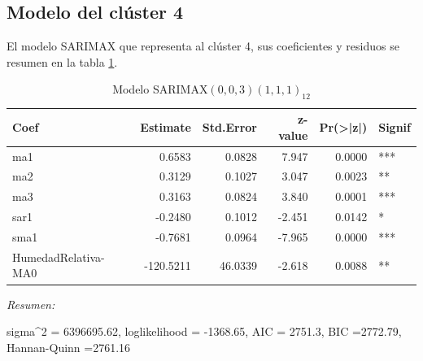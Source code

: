 \documentclass[12pt,oneside]{book}\usepackage[]{graphicx}\usepackage[]{color}
\newenvironment{knitrout}{}{} %
\theoremstyle{definition} %
\begin{document}
\subsection{Modelo del clúster 4}



El modelo SARIMAX que representa al clúster 4, sus coeficientes y residuos se resumen en la tabla \ref{tab:sarimax_cl4}.




\begin{knitrout}
\color{fgcolor}\begin{table}

\caption{\label{tab:unnamed-chunk-115}\label{tab:sarimax_cl4}Modelo SARIMAX$(0,0,3)(1,1,1)_{12}$}
\centering
\begin{threeparttable}
\begin{tabular}[t]{lrrrrl}
\toprule
Coef & Estimate & Std.Error & z-value & Pr(>|z|) & Signif\\
\midrule
\rowcolor{gray!6}  ma1 & 0.6583 & 0.0828 & 7.947 & 0.0000 & ***\\
ma2 & 0.3129 & 0.1027 & 3.047 & 0.0023 & **\\
\rowcolor{gray!6}  ma3 & 0.3163 & 0.0824 & 3.840 & 0.0001 & ***\\
sar1 & -0.2480 & 0.1012 & -2.451 & 0.0142 & *\\
\rowcolor{gray!6}  sma1 & -0.7681 & 0.0964 & -7.965 & 0.0000 & ***\\
\addlinespace
HumedadRelativa-MA0 & -120.5211 & 46.0339 & -2.618 & 0.0088 & **\\
\bottomrule
\end{tabular}
\begin{tablenotes}
\item \textit{Resumen:} 
\item sigma\textasciicircum{}2 = 6396695.62, loglikelihood = -1368.65, AIC = 2751.3, BIC =2772.79, Hannan-Quinn =2761.16
\end{tablenotes}
\end{threeparttable}
\end{table}


\end{knitrout}
\end{document}
